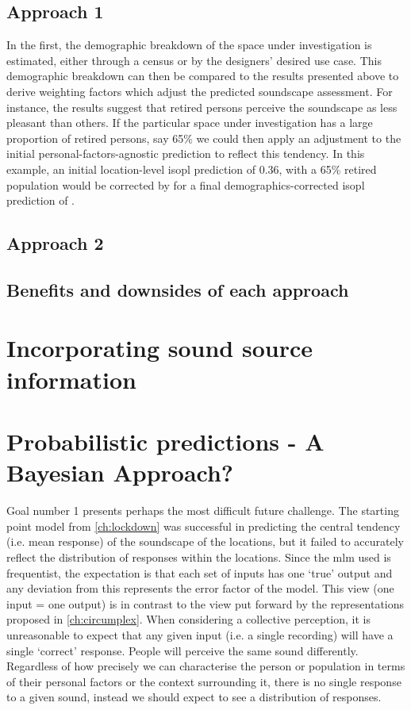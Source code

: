 \subsection{Approach 1}
In the first, the demographic breakdown of the space under investigation is estimated, either through a census or by the designers' desired use case. This demographic breakdown can then be compared to the results presented above \citep{Erfanian2021Psychological} to derive weighting factors which adjust the predicted soundscape assessment. For instance, the results suggest that retired persons perceive the soundscape as  less pleasant than others. If the particular space under investigation has a large proportion of retired persons, say 65\% we could then apply an adjustment to the initial personal-factors-agnostic prediction to reflect this tendency. In this example, an initial location-level \gls{isopl} prediction of 0.36, with a 65\% retired population would be corrected by  for a final demographics-corrected \gls{isopl} prediction of .

\subsection{Approach 2}

\subsection{Benefits and downsides of each approach}

\section{Incorporating sound source information}

\section{Probabilistic predictions - A Bayesian Approach?}

Goal number 1 presents perhaps the most difficult future challenge. The starting point model from \cref{ch:lockdown} was successful in predicting the central tendency (i.e. mean response) of the soundscape of the locations, but it failed to accurately reflect the distribution of responses within the locations. Since the \gls{mlm} used is frequentist, the expectation is that each set of inputs has one `true' output and any deviation from this represents the error factor of the model. This view (one input = one output) is in contrast to the view put forward by the representations proposed in \cref{ch:circumplex}. When considering a collective perception, it is unreasonable to expect that any given input (i.e. a single recording) will have a single `correct' response. People will perceive the same sound differently. Regardless of how precisely we can characterise the person or population in terms of their personal factors or the context surrounding it, there is no single response to a given sound, instead we should expect to see a distribution of responses. 

